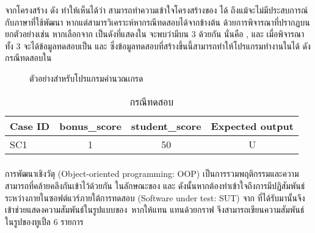 {{จากโครงสร้าง{\sourcecode} ดัง{} ทำให้เห็นได้ว่า {\tester}สามารถทำความเข้าใจโครงสร้างของ{\sourcecode} ได้ 
ถึงแม้{\tester}จะไม่มีประสบการณ์กับภาษาที่ใช้พัฒนา หากแต่{\tester}สามารวิเคราะห์หากรณีทดสอบได้จาก{\cfg}ข้างต้น 
ด้วยการพิจารณา{\PredicateNode}ที่ปรากฏบน{\FirstTimeDefine{\TestPath}{\TestPathEN}} ยกตัวอย่างเช่น 
หากเลือก{\Path}จาก{} เป็น{\TestPath}ดังที่แสดงใน{} จะพบว่ามี{\PredicateNode}บน{\TestPath} 3 {\Node} 
ด้วยกัน นั่นคือ ,  และ  เมื่อพิจารณา{\PredicateNode}ทั้ง 3 {\Node}จะได้ข้อมูลทดสอบเป็น  และ 
 ซึ่งข้อมูลทดสอบที่สร้างขึ้นนี้สามารถทำให้โปรแกรมทำงานใน{\TestPath}ได้ 
ดังกรณีทดสอบใน

\begin{figure}[ht!]
    \centering
    \caption{ตัวอย่าง{\TestPath}สำหรับโปรแกรมคำนวณเกรด}
    \label{fig:testpath}
\end{figure}


\begin{table}[ht!]
    \centering
    \caption{กรณีทดสอบ}
    \label{tab:simpleTestCase}
    \begin{tabular}{|l|c|c|c|}
        \hline
        \rowcolor{LightGray}
        Case ID     & bonus\_score  & student\_score    & Expected output \\
        \hline
        SC1         & 1             & 50                & U \\
        \hline
    \end{tabular}
\end{table}

\subsubsection{\FirstTimeDefine{\scg}{\scgEN}}
\label{sec:sub:sub:scg}

การพัฒนา{\software}เชิงวัตุ (Object-oriented programming: OOP) เป็นการรวมพฤติกรรมและความสามารถที่คล้ายคลึงกันเข้าไว้ด้วยกัน \cite{kindler2011}
ในลักษณะของ\FirstTimeDefine{\class}{\classEN} \FirstTimeDefine{\method}{\methodEN} และ \FirstTimeDefine{\attribute}{\attributeEN} 
ดังนั้นหากต้องทำเข้าใจถึงการมีปฏิสัมพันธ์ระหว่าง{\class}ภายในซอฟต์แวร์ภายใต้การทดสอบ (Software under test: SUT) จาก{\sourcecode} 
ที่ได้รับมานั้น{\scg}จึงเข้าช่วยแสดงความสัมพันธ์ในรูปแบบของ\FirstTimeDefine{\DirectedMultiGraph}{\DirectedMultiGraphEN}\ หากให้แทน{\software}  
แทนด้วยกราฟ  จึงสามารถเขียนความสัมพันธ์ในรูปของทูเปิ้ล 6 รายการ 

}}
